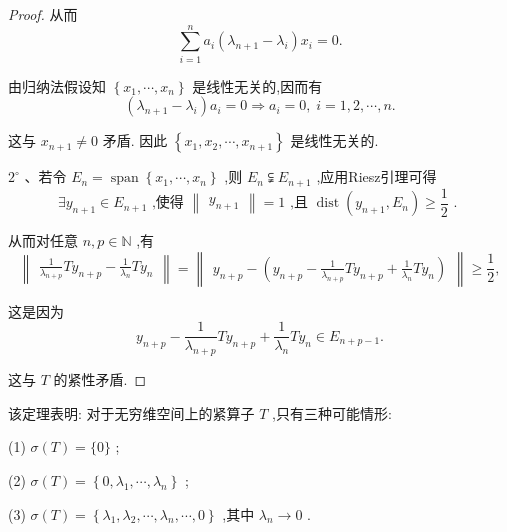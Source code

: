 \documentclass[lang=cn,newtx,10pt,scheme=chinese,thmcnt=chapter]{elegantbook}
\begin{document}
\begin{proof}
从而
\begin{equation*}
\mathop{\sum }\limits_{{i = 1}}^{n}{a}_{i}\left( {{\lambda }_{n + 1} - {\lambda }_{i}}\right) {x}_{i} = 0.
\end{equation*}

由归纳法假设知 \(\left\{  {{x}_{1},\cdots ,{x}_{n}}\right\}\) 是线性无关的,因而有
\begin{equation*}
\left( {{\lambda }_{n + 1} - {\lambda }_{i}}\right) {a}_{i} = 0 \Rightarrow  {a}_{i} = 0,\;i = 1,2,\cdots ,n.
\end{equation*}

这与 \({x}_{n + 1} \neq  0\) 矛盾. 因此 \(\left\{  {{x}_{1},{x}_{2},\cdots ,{x}_{n + 1}}\right\}\) 是线性无关的.

\({2}^{ \circ  }\) 、若令 \({E}_{n} = \operatorname{span}\left\{  {{x}_{1},\cdots ,{x}_{n}}\right\}\) ,则 \({E}_{n} \subsetneqq  {E}_{n + 1}\) ,应用Riesz引理可得
\begin{equation*}
\exists {y}_{n + 1} \in  {E}_{n + 1}\text{ ,使得 }\begin{Vmatrix}{y}_{n + 1}\end{Vmatrix} = 1\text{ ,且 }\operatorname{dist}\left( {{y}_{n + 1},{E}_{n}}\right)  \geq  \frac{1}{2}\text{ . }
\end{equation*}

从而对任意 \(n,p \in  \mathbb{N}\) ,有
\begin{equation*}
\begin{Vmatrix}{\frac{1}{{\lambda }_{n + p}}T{y}_{n + p} - \frac{1}{{\lambda }_{n}}T{y}_{n}}\end{Vmatrix} = \begin{Vmatrix}{{y}_{n + p} - \left( {{y}_{n + p} - \frac{1}{{\lambda }_{n + p}}T{y}_{n + p} + \frac{1}{{\lambda }_{n}}T{y}_{n}}\right) }\end{Vmatrix} \geq  \frac{1}{2},
\end{equation*}

这是因为
\begin{equation*}
{y}_{n + p} - \frac{1}{{\lambda }_{n + p}}T{y}_{n + p} + \frac{1}{{\lambda }_{n}}T{y}_{n} \in  {E}_{n + p - 1}.
\end{equation*}

这与 \(T\) 的紧性矛盾.

\end{proof}
\begin{note}
    该定理表明: 对于无穷维空间上的紧算子 \(T\) ,只有三种可能情形:

(1) \(\sigma \left( T\right)  = \{ 0\}\) ;

(2) \(\sigma \left( T\right)  = \left\{  {0,{\lambda }_{1},\cdots ,{\lambda }_{n}}\right\}\) ;

(3) \(\sigma \left( T\right)  = \left\{  {{\lambda }_{1},{\lambda }_{2},\cdots ,{\lambda }_{n},\cdots ,0}\right\}\) ,其中 \({\lambda }_{n} \rightarrow  0\) .

\end{note}
\end{document}
